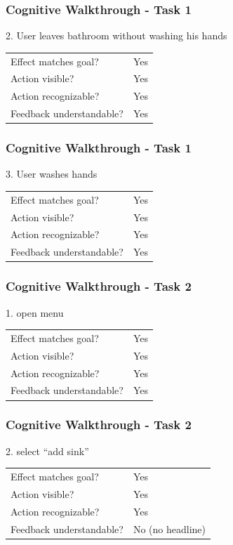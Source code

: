 \documentclass{beamer}
\begin{document}
\begin{frame}
  \frametitle{Cognitive Walkthrough - Task 1}
  2. User leaves bathroom without washing his hands 

  \vspace{10pt}
  \begin{tabular}{ll}
    Effect matches goal?     & Yes \\
    Action visible?          & Yes \\
    Action recognizable?     & Yes \\
    Feedback understandable? & Yes \\
  \end{tabular}
\end{frame}

\begin{frame}
  \frametitle{Cognitive Walkthrough - Task 1}
  3. User washes hands 

  \vspace{10pt}
  \begin{tabular}{ll}
    Effect matches goal?     & Yes \\
    Action visible?          & Yes \\
    Action recognizable?     & Yes \\
    Feedback understandable? & Yes \\
  \end{tabular}
\end{frame}

\begin{frame}
  \frametitle{Cognitive Walkthrough - Task 2}
  1. open menu

  \vspace{10pt} 
  \begin{tabular}{ll}
    Effect matches goal?     & Yes \\
    Action visible?          & Yes \\
    Action recognizable?     & Yes \\
    Feedback understandable? & Yes \\
  \end{tabular}
\end{frame}

\begin{frame}
  \frametitle{Cognitive Walkthrough - Task 2}
  2. select ``add sink'' 

  \vspace{10pt}
  \begin{tabular}{ll}
    Effect matches goal?     & Yes \\
    Action visible?          & Yes \\
    Action recognizable?     & Yes \\
    Feedback understandable? & No (no headline) \\
  \end{tabular}
\end{frame}
\end{document}

